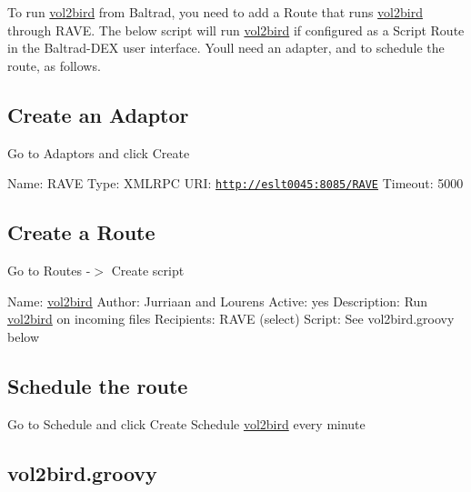 To run \mbox{\hyperlink{structvol2bird}{vol2bird}} from Baltrad, you need to add a Route that runs \mbox{\hyperlink{structvol2bird}{vol2bird}} through R\+A\+VE. The below script will run \mbox{\hyperlink{structvol2bird}{vol2bird}} if configured as a Script Route in the Baltrad-\/\+D\+EX user interface. You\textquotesingle{}ll need an adapter, and to schedule the route, as follows.

\subsection*{Create an Adaptor}

Go to Adaptors and click Create

Name\+: R\+A\+VE Type\+: X\+M\+L\+R\+PC U\+RI\+: \href{http://eslt0045:8085/RAVE}{\tt http\+://eslt0045\+:8085/\+R\+A\+VE} Timeout\+: 5000

\subsection*{Create a Route}

Go to Routes -\/$>$ Create script

Name\+: \mbox{\hyperlink{structvol2bird}{vol2bird}} Author\+: Jurriaan and Lourens Active\+: yes Description\+: Run \mbox{\hyperlink{structvol2bird}{vol2bird}} on incoming files Recipients\+: R\+A\+VE (select) Script\+: See vol2bird.\+groovy below

\subsection*{Schedule the route}

Go to Schedule and click Create Schedule \mbox{\hyperlink{structvol2bird}{vol2bird}} every minute

\subsection*{vol2bird.\+groovy}


